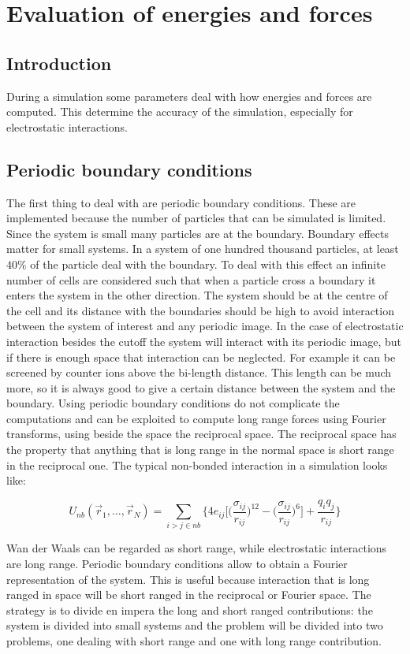\chapter{Evaluation of energies and forces}

\section{Introduction}
During a simulation some parameters deal with how energies and forces are computed.
This determine the accuracy of the simulation, especially for electrostatic interactions.

\section{Periodic boundary conditions}
The first thing to deal with are periodic boundary conditions.
These are implemented because the number of particles that can be simulated is limited.
Since the system is small many particles are at the boundary.
Boundary effects matter for small systems.
In a system of one hundred thousand particles, at least $40\%$ of the particle deal with the boundary.
To deal with this effect an infinite number of cells are considered such that when a particle cross a boundary it enters the system in the other direction.
The system should be at the centre of the cell and its distance with the boundaries should be high to avoid interaction between the system of interest and any periodic image.
In the case of electrostatic interaction besides the cutoff the system will interact with its periodic image, but if there is enough space that interaction can be neglected.
For example it can be screened by counter ions above the bi-length distance.
This length can be much more, so it is always good to give a certain distance between the system and the boundary.
Using periodic boundary conditions do not complicate the computations and can be exploited to compute long range forces using Fourier transforms, using beside the space the reciprocal space.
The reciprocal space has the property that anything that is long range in the normal space is short range in the reciprocal one.
The typical non-bonded interaction in a simulation looks like:

$$U_{nb}(\vec{r}_1, \dots, \vec{r}_N) = \sum\limits_{i>j\in nb}\biggl\{4e_{ij}\biggl[\biggl(\frac{\sigma_{ij}}{r_{ij}}\biggr)^{12}-\biggl(\frac{\sigma_{ij}}{r_{ij}}\biggr)^6\biggr] + \frac{q_iq_j}{r_{ij}}\biggr\}$$

Wan der Waals can be regarded as short range, while electrostatic interactions are long range.
Periodic boundary conditions allow to obtain a Fourier representation of the system.
This is useful because interaction that is long ranged in space will be short ranged in the reciprocal or Fourier space.
The strategy is to divide en impera the long and short ranged contributions: the system is divided into small systems and the problem will be divided into two problems, one dealing with short range and one with long range contribution.


